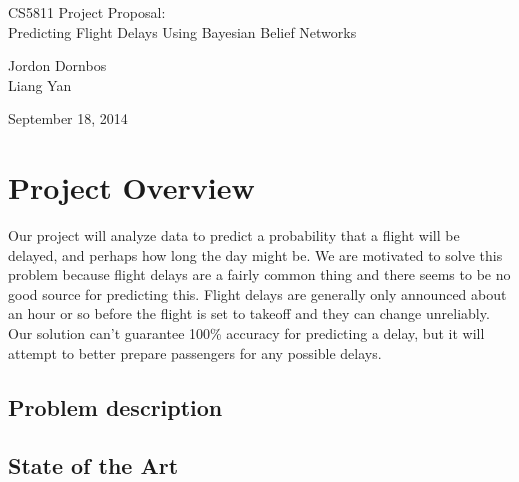 \documentclass[12pt]{article}
\begin{document}
\begin{center}
{\large CS5811 Project Proposal:}\\
{\large Predicting Flight Delays Using Bayesian Belief Networks}

{\small Jordon Dornbos\\}
{\small Liang Yan\\}

{\small September 18, 2014\\}

\end{center}

\section{Project Overview}


Our project will analyze data to predict a probability that a flight will be delayed, and perhaps how long the day might be. We are motivated to solve this problem because flight delays are a fairly common thing and there seems to be no good source for predicting this. Flight delays are generally only announced about an hour or so before the flight is set to takeoff and they can change unreliably. Our solution can't guarantee 100\% accuracy for predicting a delay, but it will attempt to better prepare passengers for any possible delays.

\subsection{Problem description}
\label{sec:problem-desc}


\subsection{State of the Art}
\end{document}
